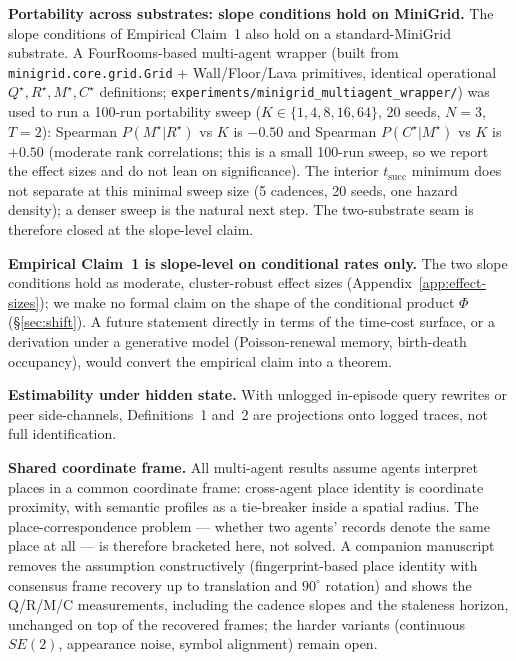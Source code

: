 \documentclass{article}
\begin{document}
\textbf{Portability across substrates: slope conditions hold on MiniGrid.} The slope conditions of Empirical Claim~1 also hold on a standard-MiniGrid substrate. A FourRooms-based multi-agent wrapper (built from \texttt{minigrid.core.grid.Grid} + Wall/Floor/Lava primitives, identical operational $Q^\star,R^\star,M^\star,C^\star$ definitions; \texttt{experiments/minigrid\_multiagent\_wrapper/}) was used to run a 100-run portability sweep ($K{\in}\{1,4,8,16,64\}$, 20 seeds, $N{=}3$, $T{=}2$): Spearman $P(M^\star|R^\star)$ vs $K$ is $-0.50$ and Spearman $P(C^\star|M^\star)$ vs $K$ is $+0.50$ (moderate rank correlations; this is a small 100-run sweep, so we report the effect sizes and do not lean on significance). The interior $t_{\mathrm{succ}}$ minimum does not separate at this minimal sweep size (5 cadences, 20 seeds, one hazard density); a denser sweep is the natural next step. The two-substrate seam is therefore closed at the slope-level claim.

\textbf{Empirical Claim~1 is slope-level on conditional rates only.} The two slope conditions hold as moderate, cluster-robust effect sizes (Appendix~\ref{app:effect-sizes}); we make no formal claim on the shape of the conditional product $\Phi$ (\S\ref{sec:shift}). A future statement directly in terms of the time-cost surface, or a derivation under a generative model (Poisson-renewal memory, birth-death occupancy), would convert the empirical claim into a theorem.

\textbf{Estimability under hidden state.} With unlogged in-episode query rewrites or peer side-channels, Definitions~1 and~2 are projections onto logged traces, not full identification.

\textbf{Shared coordinate frame.} All multi-agent results assume agents
interpret places in a common coordinate frame: cross-agent place
identity is coordinate proximity, with semantic profiles as a
tie-breaker inside a spatial radius. The place-correspondence problem
--- whether two agents' records denote the same place at all --- is
therefore bracketed here, not solved. A companion manuscript removes
the assumption constructively (fingerprint-based place identity with
consensus frame recovery up to translation and $90^\circ$ rotation)
and shows the Q/R/M/C measurements, including the cadence slopes and
the staleness horizon, unchanged on top of the recovered frames; the
harder variants (continuous $SE(2)$, appearance noise, symbol
alignment) remain open.
\end{document}
